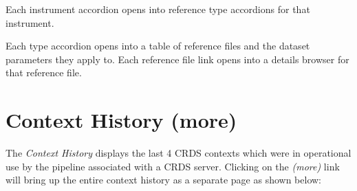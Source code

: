 \documentclass[letterpaper,10pt,english]{sphinxmanual}
\begin{document}
Each instrument accordion opens into reference type accordions for that instrument.

Each type accordion opens into a table of reference files and the dataset parameters
they apply to.   Each reference file link opens into a details browser for that reference
file.


\section{Context History (more)}
\label{web_site_use:context-history-more}
The \emph{Context History} displays the last 4 CRDS contexts which were in operational use by
the pipeline associated with a CRDS server. Clicking on the \emph{(more)} link will bring up
the entire context history as a separate page as shown below:
\begin{figure}[htbp]
\centering

\end{figure}
\end{document}
